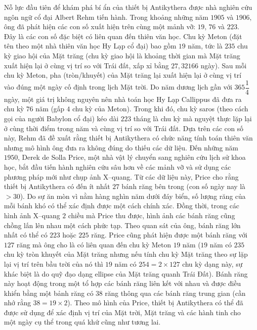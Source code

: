 \begin{multicols}{2}
	Nỗ lực đầu tiên để khám phá bí ẩn của thiết bị Antikythera được nhà nghiên cứu ngôn ngữ cổ đại Albert Rehm tiến hành. Trong khoảng những năm $1905$ và $1906$, ông đã phát hiện các con số xuất hiện trên cùng một mảnh vỡ: $19$, $76$ và $223$. Đây là các con số đặc biệt có liên quan đến thiên văn học. Chu kỳ Meton (đặt tên theo một nhà thiên văn học Hy Lạp cổ đại) bao gồm $19$ năm, tức là $235$ chu kỳ giao hội của Mặt trăng (chu kỳ giao hội là khoảng thời gian mà Mặt trăng xuất hiện lại ở cùng vị trí so với Trái đất, xấp xỉ bằng $27{,}32166$ ngày). Sau mỗi chu kỳ Meton, pha (tròn/khuyết) của Mặt trăng lại xuất hiện lại ở cùng vị trí vào đúng một ngày cố định trong lịch Mặt trời. Do năm dương lịch gần với $365\dfrac{1}{4}$ ngày, một giá trị không nguyên nên nhà toán học Hy Lạp Callippus đã đưa ra chu kỳ $76$ năm (gấp $4$ chu kỳ của Meton). Trong khi đó, chu kỳ saros (theo cách gọi của người Babylon cổ đại) kéo dài $223$ tháng là chu kỳ mà nguyệt thực lặp lại ở cùng thời điểm trong năm và cùng vị trí so với Trái đất. Dựa trên các con số này, Rehm đã đề xuất rằng thiết bị Antikythera có chức năng tính toán thiên văn nhưng mô hình ông đưa ra không đúng do thiếu các dữ liệu.
	\vskip 0.1cm
	Đến những năm $1950$, Derek de Solla Price, một nhà vật lý chuyển sang nghiên cứu lịch sử khoa học, bắt đầu tiến hành nghiên cứu sâu hơn về các mảnh vỡ và sử dụng các phương pháp mới như chụp ảnh X--quang. Từ các dữ liệu này, Price cho rằng thiết bị Antikythera có đến ít nhất $27$ bánh răng bên trong (con số ngày nay là $> 30$). Do sự ăn mòn vì nằm hàng nghìn năm dưới đáy biển, số lượng răng của mỗi bánh khó có thể xác định được một cách chính xác. Đồng thời, trong các hình ảnh X--quang $2$ chiều mà Price thu được, hình ảnh các bánh răng cũng chồng lấn lên nhau một cách phức tạp. Theo quan sát của ông, bánh răng lớn nhất có thể có $223$ hoặc $225$ răng. Price cũng phát hiện được một bánh răng với $127$ răng mà ông cho là có liên quan đến chu kỳ Meton $19$ năm ($19$ năm có $235$ chu kỳ tròn khuyết của Mặt trăng nhưng nếu tính chu kỳ Mặt trăng theo sự lặp lại vị trí trên bầu trời của nó thì $19$ năm có $254=2\times127$ chu kỳ dạng này, sự khác biệt là do quỹ đạo dạng ellipse của Mặt trăng quanh Trái Đất). Bánh răng này hoạt động trong một tổ hợp các bánh răng liên kết với nhau và được điều khiển bằng một bảnh răng có $38$ răng thông qua các bánh răng trung gian (cần nhớ rằng $38=19\times2$). Theo mô hình của Price, thiết bị Antikythera có thể đã được sử dụng để xác định vị trí của Mặt trời, Mặt trăng và các hành tinh cho một ngày cụ thể trong quá khứ cũng như tương lai.
	\begin{figure}[H]

\end{figure}
\end{multicols}
